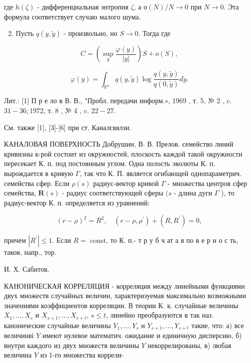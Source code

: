 \documentclass[10pt]{article}
\begin{document}
где $h(\zeta)$ - дифференциальная энтропия $\zeta$, а $о(N) / N \rightarrow 0$ при $N \rightarrow 0$. Эта формула соответствует случаю малого шума.



\begin{enumerate}

  \setcounter{enumi}{1}

  \item Пусть $q(y, \tilde{y})$ - произвольно, но $S \rightarrow 0$. Тогда где

\end{enumerate}



\[

C=\left(\sup _{y} \frac{\varphi(y)}{|y|}\right) S+o(S),

\]



\[

\varphi(y)=\int_{\mathbb{R}^{n}} q(y, \tilde{y}) \log \frac{q(y, \tilde{y})}{q(0, \tilde{y})} d \tilde{y} .

\]



Лит.: [1] П р е ло в В. В., "Пробл. передачи информ.», 1969 , т. 5, № 2 , c. $31-36 ; 1972$, т. 8 , № 4 , c. $22-27$.



См. также [1], [3]-[6] при ст. Каналсвялзи.



КАНАЛОВАЯ ПОВЕРХНОСТЬ Добрушин, В. В. Прелов. семейство линий кривизны к-рой состоит из окружностей, плоскость каждой такой окружности пересекает К. п. под постоянным углом. Одна полость эволюты К. п. вырождается в кривую $\Gamma$, так что К. П. является огибающей однопараметрич. семейства сфер. Если $\rho(s)$ радиус-вектор кривой $\Gamma$ - множества центров сфер семейства, $\boldsymbol{R}(s)$ - радиус соответствующей сферы $(s$ - длина дуги $\Gamma$ ), то радиус-вектор К. п. определяется из уравнений:



\[

(r-\rho)^{2}=R^{2}, \quad\left(r-\rho, \rho^{\prime}\right)+\left(R, R^{\prime}\right)=0,

\]



причем $\left|R^{\prime}\right| \leqslant 1$. Если $R=$ const, то К. п.- т р у б ч ат а я по в е р н о с ть, таков, напр., тор.



И. Х. Сабитов.



КАНОНИЧЕСКАЯ КОРРЕЛЯЦИЯ - корреляция между линейными функциями двух множеств случайных величин, характеризуемая максимально возможными значениями коэффициентов корреляции. В теории К. к. случайные величины $X_{1}, \ldots, X_{s}$ и $X_{s+1}, \ldots, X_{s+t}$, $s \leqslant t$, линейно преобразуются в так наз. канонические случайные величины $Y_{1}, \ldots, Y_{s}$ и $Y_{s+1}, \ldots, Y_{s+t}$ такие, что: а) все величинві $Y$ имеют нулевое математич. ожидание и единичную дисперсию, б) внутри каждого из двух множеств величины $Y$ некоррелированы, в) любая величина $Y$ из 1-го множества коррели-
\end{document}
